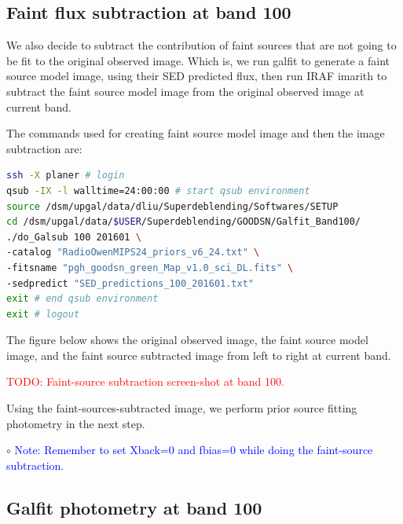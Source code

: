 \documentclass[11pt,a4paper]{article}
\begin{document}
\subsection{Faint flux subtraction at band 100}
\label{Band100_Galsub}

We also decide to subtract the contribution of faint sources that are not going to be fit to the original observed image. Which is, we run galfit to generate a faint source model image, using their SED predicted flux, then run IRAF imarith to subtract the faint source model image from the original observed image at current band. 

The commands used for creating faint source model image and then the image subtraction are:

\begin{lstlisting}[language=bash]
ssh -X planer # login
qsub -IX -l walltime=24:00:00 # start qsub environment
source /dsm/upgal/data/dliu/Superdeblending/Softwares/SETUP
cd /dsm/upgal/data/$USER/Superdeblending/GOODSN/Galfit_Band100/
./do_Galsub 100 201601 \
-catalog "RadioOwenMIPS24_priors_v6_24.txt" \
-fitsname "pgh_goodsn_green_Map_v1.0_sci_DL.fits" \
-sedpredict "SED_predictions_100_201601.txt"
exit # end qsub environment
exit # logout
\end{lstlisting}

The figure below shows the original observed image, the faint source model image, and the faint source subtracted image from left to right at current band. 

\textcolor{red}{TODO: Faint-source subtraction screen-shot at band 100.}

Using the faint-sources-subtracted image, we perform prior source fitting photometry in the next step. 

\indent\hspace{15pt}$\circ$ 
\textcolor{blue}{Note: Remember to set Xback=0 and fbias=0 while doing the faint-source subtraction.}
\\

\subsection{Galfit photometry at band 100}
\label{Band100_Galfit}
\end{document}
